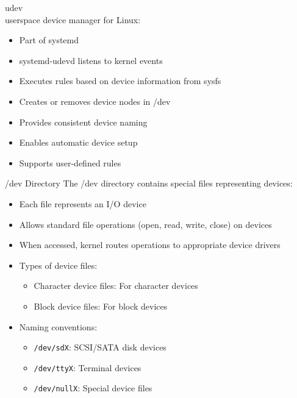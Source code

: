 \begin{definition}{udev}\\
    userspace device manager for Linux:
    \begin{itemize}
        \item Part of systemd
        \item systemd-udevd listens to kernel events
        \item Executes rules based on device information from sysfs
        \item Creates or removes device nodes in /dev
        \item Provides consistent device naming
        \item Enables automatic device setup
        \item Supports user-defined rules
    \end{itemize}
\end{definition}

\multend

\begin{definition}{/dev Directory}
    The /dev directory contains special files representing devices:
    \begin{itemize}
        \item Each file represents an I/O device
        \item Allows standard file operations (open, read, write, close) on devices
        \item When accessed, kernel routes operations to appropriate device drivers
        \item Types of device files:
            \begin{itemize}
                \item Character device files: For character devices
                \item Block device files: For block devices
            \end{itemize}
        \item Naming conventions:
            \begin{itemize}
                \item \texttt{/dev/sdX}: SCSI/SATA disk devices
                \item \texttt{/dev/ttyX}: Terminal devices
                \item \texttt{/dev/nullX}: Special device files
            \end{itemize}
    \end{itemize}
\end{definition}





